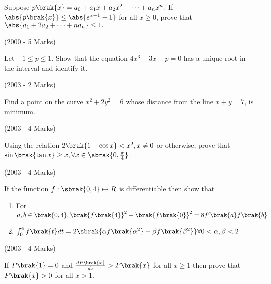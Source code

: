 \iffalse
\title{JEE ADVANCED Assignment 1}
\author{Homa Harshitha Vuddanti(EE24BTECH11062)}
\section{subjective}
\fi

   
\item Suppose $p\brak{x}=a_{0}+a_{1}x+a_{2}x^{2}+\dots +a_{n}x^{n}.$ If $\abs{p\brak{x}}\leq\abs{e^{x-1}-1}$ for all $x\geq0$, prove that $\abs{a_{1}+2a_{2
}+\dots+na_{n}}\leq1.$

 \hfill{(2000 - 5 Marks)}\\
 \item Let $-1\leq p\leq1.$ Show that the equation $4x^{3}-3x-p=0$ has a unique root in the interval  and identify it.

 \hfill{(2003 - 2 Marks)}\\
 
 \item Find a point on the curve $x^{2}+2y^{2}=6$ whose distance from the line $x+y=7$, is minimum.

 \hfill{(2003 - 4 Marks)}\\
 
\item Using the relation $2\brak{1-\cos x}<x^{2},x\neq0$ or otherwise, prove that $\sin \brak{\tan x}\geq x, \forall x \in\sbrak{0, \frac{\pi}{4}}$.

 \hfill{(2003 - 4 Marks)}\\

\item If the function $f:\sbrak{0,4}\mapsto R$ is differentiable then show that 
 \begin{enumerate}
 
  \item For $a,b \in \brak{0,4},\brak{f\brak{4}}^{2}-\brak{f\brak{0}}^{2}=8f^{\prime}\brak{a}f\brak{b}$
  \item $\int_{0}^{4} f\brak{t}dt=2\sbrak{\alpha f\brak{\alpha^{2}}+\beta f\brak{\beta^{2}}}\forall0<\alpha, \beta <2$ \\
  
\end{enumerate}

\hfill{(2003 - 4 Marks)}\\

\item If $P\brak{1}=0$ and $\frac{dP\brak{x}}{dx}>P\brak{x}$ for all $x\geq 1$ then prove that $P\brak{x}>0$ for all $x>1.$

